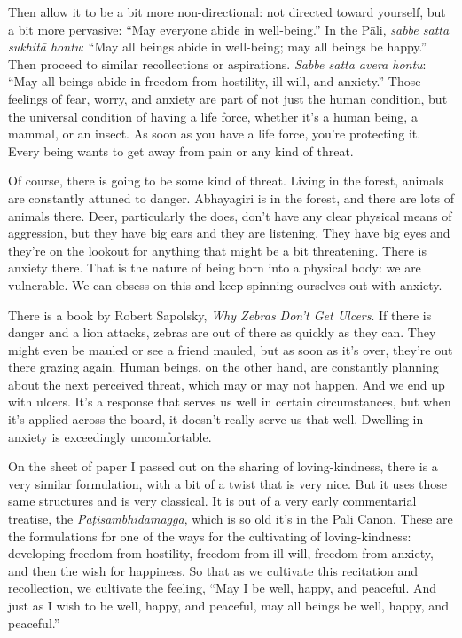 Then allow it to be a bit more non-directional: not directed toward
yourself, but a bit more pervasive: “May everyone abide in well-being.”
In the Pāli, \emph{sabbe satta sukhitā hontu}: “May all beings abide in
well-being; may all beings be happy.” Then proceed to similar
recollections or aspirations. \emph{Sabbe satta avera hontu}: “May all
beings abide in freedom from hostility, ill will, and anxiety.” Those
feelings of fear, worry, and anxiety are part of not just the human
condition, but the universal condition of having a life force, whether
it’s a human being, a mammal, or an insect. As soon as you have a life
force, you’re protecting it. Every being wants to get away from pain or
any kind of threat.

Of course, there is going to be some kind of threat. Living in the
forest, animals are constantly attuned to danger. Abhayagiri is in the
forest, and there are lots of animals there. Deer, particularly the
does, don’t have any clear physical means of aggression, but they have
big ears and they are listening. They have big eyes and they’re on the
lookout for anything that might be a bit threatening. There is anxiety
there. That is the nature of being born into a physical body: we are
vulnerable. We can obsess on this and keep spinning ourselves out with
anxiety.

There is a book by Robert Sapolsky, \emph{Why Zebras Don’t Get Ulcers}.
If there is danger and a lion attacks, zebras are out of there as
quickly as they can. They might even be mauled or see a friend mauled,
but as soon as it’s over, they’re out there grazing again. Human beings,
on the other hand, are constantly planning about the next perceived
threat, which may or may not happen. And we end up with ulcers. It’s a
response that serves us well in certain circumstances, but when it’s
applied across the board, it doesn’t really serve us that well. Dwelling
in anxiety is exceedingly uncomfortable.

On the sheet of paper I passed out on the sharing of loving-kindness,
there is a very similar formulation, with a bit of a twist that is very
nice. But it uses those same structures and is very classical. It is out
of a very early commentarial treatise, the \emph{Paṭisambhidāmagga},
which is so old it’s in the Pāli Canon. These are the formulations for
one of the ways for the cultivating of loving-kindness: developing
freedom from hostility, freedom from ill will, freedom from anxiety, and
then the wish for happiness. So that as we cultivate this recitation and
recollection, we cultivate the feeling, “May I be well, happy, and
peaceful. And just as I wish to be well, happy, and peaceful, may all
beings be well, happy, and peaceful.”

